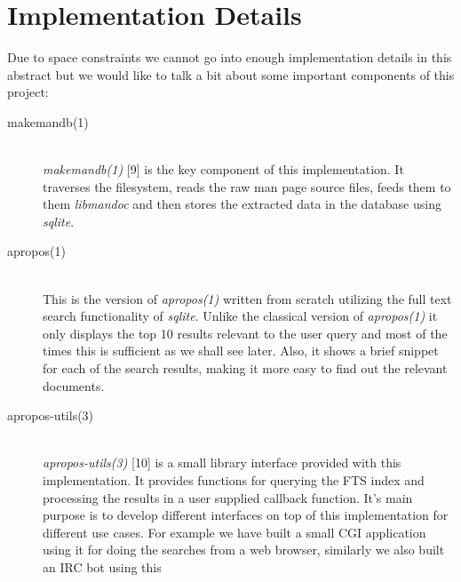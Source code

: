 \documentclass[titlepage, a4paper, 12pt]{article}
\begin{document}
\section{Implementation Details}
Due to space constraints we cannot go into enough implementation details in this
abstract but we would like to talk a bit about some important components of this
project:
\begin{description}
\item[makemandb(1)] \hfill \\
\textit{makemandb(1)} [9] is the key component of this implementation. It
traverses the filesystem, reads the raw man page source files, feeds them to them
\textit{libmandoc} and then stores the extracted data in the database using
\textit{sqlite}.
\end{description}
\begin{description}
\item[apropos(1)] \hfill \\
This is the version of \textit{apropos(1)} written from scratch utilizing the
full text search functionality of \textit{sqlite}. Unlike the classical version
of \textit{apropos(1)} it only displays the top 10 results relevant to the user
query and most of the times this is sufficient as we shall see later. Also, it
shows a brief snippet for each of the search results, making it more easy to
find out the relevant documents.
\end{description}
\begin{description}
\item[apropos-utils(3)] \hfill \\
\textit{apropos-utils(3)} [10] is a small library interface provided with this
implementation.
It provides functions for querying the FTS index and processing the results in
a user supplied callback function. It's main purpose is to develop different
interfaces on top of this implementation for different use cases. For example we
have built a small CGI application using it for doing the searches from a web
browser, similarly we also built an IRC bot using this 
\end{description}
\end{document}
